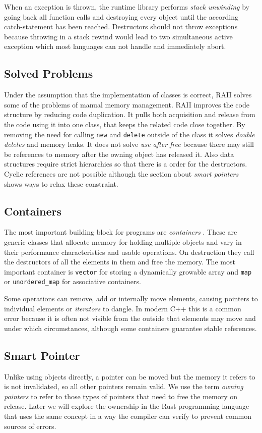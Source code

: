 \documentclass[conference,twocolumn]{IEEEtran}
\begin{document}
When an exception is thrown, the runtime library performs \emph{stack unwinding} by going back all function calls and destroying every object until the according catch-statement has been reached. Destructors should not throw exceptions because throwing in a stack rewind would lead to two simultaneous active exception which most languages can not handle and immediately abort. \cite{cpp14std}

\subsection{Solved Problems}
Under the assumption that the implementation of classes is correct, RAII solves some of the problems of manual memory management.
RAII improves the code structure by reducing code duplication. It pulls both acquisition and release from the code using it into one class, that keeps the related code close together. By removing the need for calling \verb|new| and \verb|delete| outside of the class it solves \emph{double deletes} and memory leaks. It does not solve \emph{use after free} because there may still be references to memory after the owning object has released it.
Also data structures require strict hierarchies so that there is a order for the destructors. Cyclic references are not possible although the section about \emph{smart pointers} shows ways to relax these constraint.


\subsection{Containers}
The most important building block for programs are \emph{containers} \cite{stroustrupFoundationsCpp}. These are generic classes that allocate memory for holding multiple objects and vary in their performance characteristics and usable operations. On destruction they call the destructors of all the elements in them and free the memory. The most important container is \verb|vector| for storing a dynamically growable array and \verb|map| or \verb|unordered_map| for associative containers.

Some operations can remove, add or internally move elements, causing pointers to individual elements or \emph{iterators} to dangle. In modern C++ this is a common error because it is often not visible from the outside that elements may move and under which circumstances, although some containers guarantee stable references.


\subsection{Smart Pointer}
Unlike using objects directly, a pointer can be moved but the memory it refers to is not invalidated, so all other pointers remain valid. We use the term \emph{owning pointers} to refer to those types of pointers that need to free the memory on release. Later we will explore the ownership in the Rust programming language that uses the same concept in a way the compiler can verify to prevent common sources of errors.
\end{document}
